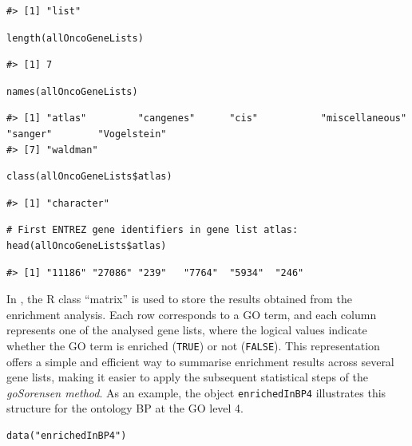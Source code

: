 \begin{verbatim}
#> [1] "list"
\end{verbatim}

\begin{verbatim}
length(allOncoGeneLists)
\end{verbatim}

\begin{verbatim}
#> [1] 7
\end{verbatim}

\begin{verbatim}
names(allOncoGeneLists)
\end{verbatim}

\begin{verbatim}
#> [1] "atlas"         "cangenes"      "cis"           "miscellaneous" "sanger"        "Vogelstein"   
#> [7] "waldman"
\end{verbatim}

\begin{verbatim}
class(allOncoGeneLists$atlas)
\end{verbatim}

\begin{verbatim}
#> [1] "character"
\end{verbatim}

\begin{verbatim}
# First ENTREZ gene identifiers in gene list atlas:
head(allOncoGeneLists$atlas)
\end{verbatim}

\begin{verbatim}
#> [1] "11186" "27086" "239"   "7764"  "5934"  "246"
\end{verbatim}

In , the R class ``matrix'' is used to store the results obtained from the enrichment analysis. Each row corresponds to a GO term, and each column represents one of the analysed gene lists, where the logical values indicate whether the GO term is enriched (\texttt{TRUE}) or not (\texttt{FALSE}). This representation offers a simple and efficient way to summarise enrichment results across several gene lists, making it easier to apply the subsequent statistical steps of the \emph{goSorensen method}. As an example, the object \texttt{enrichedInBP4} illustrates this structure for the ontology BP at the GO level 4.

\begin{verbatim}
data("enrichedInBP4")
\end{verbatim}

